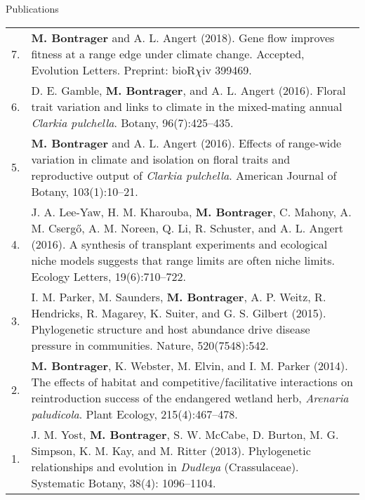 \documentclass[letterpaper,11pt,oneside]{article}
\newcommand\hangbibentry[1]{%
    \smallskip\par\hangpara{1em}{1}\bibentry{#1}\smallskip\par 
}
\begin{document}

\noindent\Large{Publications}  
\normalsize
\bigskip

\bgroup
\def\arraystretch{1.2}
\noindent \begin{tabular}{@{} p{1cm} >{\raggedright\arraybackslash}p{15.11cm}}
7. & \textbf{M. Bontrager} and A. L. Angert (2018). Gene flow improves fitness at a range edge under climate change. Accepted, Evolution Letters. Preprint: bioR$\chi$iv 399469. \\
6. & D. E. Gamble, \textbf{M. Bontrager}, and A. L. Angert (2016). Floral trait variation and links to climate in the mixed-mating annual \textit{Clarkia pulchella}. Botany, 96(7):425–435. \\
5. & \textbf{M. Bontrager} and A. L. Angert (2016). Effects of range-wide variation in climate and isolation on floral traits and reproductive output of \textit{Clarkia pulchella}. American Journal of Botany, 103(1):10–21.  \\
4. & J. A. Lee-Yaw, H. M. Kharouba, \textbf{M. Bontrager}, C. Mahony, A. M. Cserg{\H{o}}, A. M. Noreen, Q. Li, R. Schuster, and A. L. Angert (2016). A synthesis of transplant experiments and ecological niche models suggests that range limits are often niche limits. Ecology Letters, 19(6):710–722. \\
3. & I. M. Parker, M. Saunders, \textbf{M. Bontrager}, A. P. Weitz, R. Hendricks, R. Magarey, K. Suiter, and G. S. Gilbert (2015). Phylogenetic structure and host abundance drive disease pressure in communities. Nature, 520(7548):542. \\
2. & \textbf{M. Bontrager}, K. Webster, M. Elvin, and I. M. Parker (2014). The effects of habitat and competitive/facilitative interactions on reintroduction success of the endangered wetland herb, \textit{Arenaria paludicola}. Plant Ecology, 215(4):467–478. \\
1. & J. M. Yost, \textbf{M. Bontrager}, S. W. McCabe, D. Burton, M. G. Simpson, K. M. Kay, and M. Ritter (2013). Phylogenetic relationships and evolution in \textit{Dudleya} (Crassulaceae). Systematic Botany, 38(4): 1096–1104. \\
\end{tabular}
\egroup
\bigskip
\bigskip
\end{document}
